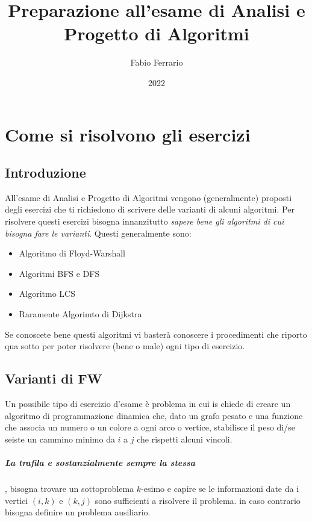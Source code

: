 \documentclass[12pt, a4paper, openany]{book}
\begin{document}
\title{Preparazione all'esame di Analisi e Progetto di Algoritmi}
\author{Fabio Ferrario}
\date{2022}
\maketitle
\tableofcontents

\chapter{Come si risolvono gli esercizi}
\section{Introduzione}
All'esame di Analisi e Progetto di Algoritmi vengono (generalmente) proposti degli esercizi che ti richiedono di scrivere delle varianti di alcuni algoritmi.
Per risolvere questi esercizi bisogna innanzitutto \emph{sapere bene gli algoritmi di cui bisogna fare le varianti}.
Questi generalmente sono:
\begin{itemize}
	\item Algoritmo di Floyd-Warshall
	\item Algoritmi BFS e DFS
	\item Algoritmo LCS
	\item Raramente Algorimto di Dijkstra
\end{itemize}
Se conoscete bene questi algoritmi vi basterà conoscere i procedimenti che riporto qua sotto per poter risolvere (bene o male) ogni tipo di esercizio.

\section{Varianti di FW}
Un possibile tipo di esercizio d'esame è problema in cui is chiede di creare un algoritmo di programmazione dinamica
che, dato un grafo pesato e una funzione che associa un numero o un colore a ogni arco o vertice, stabilisce {il peso di}/{se seiste} un cammino minimo da $i$ a $j$
che rispetti alcuni vincoli.

\paragraph{La trafila e sostanzialmente sempre la stessa}, bisogna trovare un sottoproblema $k$-esimo e capire se le informazioni date da i vertici $(i,k)$ e $(k,j)$
sono sufficienti a risolvere il problema. in caso contrario bisogna definire un problema ausiliario.
\end{document}

